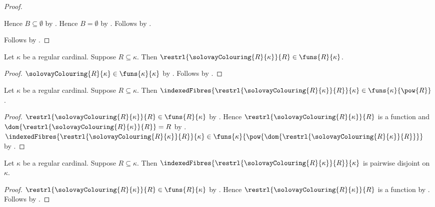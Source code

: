 \begin{proof}
\begin{subproof}
        Hence $B\subseteq\emptyset$ by .
        Hence $B=\emptyset$ by .
        Follows by .
    \end{subproof}
    Follows by \auto.
\end{proof}

\begin{proposition}\label{solovay_restricted_colouring_type}
    Let $\kappa$ be a regular cardinal.
    Suppose $R\subseteq\kappa$.
    Then $
        \in{}$.
\end{proposition}
\begin{proof}
    $\in\funs{\kappa}{\kappa}$
        by .
    Follows by .
\end{proof}

\begin{proposition}\label{solovay_cells_type}
    Let $\kappa$ be a regular cardinal.
    Suppose $R\subseteq\kappa$.
    Then $
        \in{}$.
\end{proposition}
\begin{proof}
    $\in{}$
        by .
    Hence $$ is a function and
        $=R$
        by .
    $
        \in{}$
        by .
\end{proof}

\begin{proposition}\label{solovay_cells_pairwise_disjoint}
    Let $\kappa$ be a regular cardinal.
    Suppose $R\subseteq\kappa$.
    Then $$
        is pairwise disjoint on $\kappa$.
\end{proposition}
\begin{proof}
    $\in{}$
        by .
    Hence $$ is a function
        by .
    Follows by .
\end{proof}

